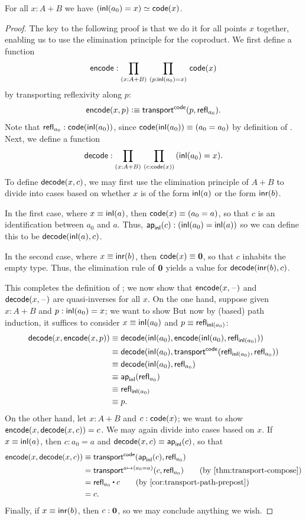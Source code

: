 \begin{thm}\label{thm:path-coprod}
  For all $x:A+B$ we have $({\mathsf{inl}}(a_0)=x) \simeq \mathsf{code}(x)$.
\end{thm}
\begin{proof}
  The key to the following proof is that we do it for all points $x$ together, enabling us to use the elimination principle for the coproduct.
  We first define a function
  \[ \encode : \prd{x:A+B}{p:\inl(a_0)=x} \code(x) \]
  by transporting reflexivity along $p$:
  \[ \mathsf{encode}(x,p) \vcentcolon\equiv \mathsf{transport}^{\mathsf{code}}(p,\mathsf{refl}_{a_0}). \]
  Note that $\mathsf{refl}_{a_0} : \mathsf{code}({\mathsf{inl}}(a_0))$, since $\mathsf{code}({\mathsf{inl}}(a_0))\equiv (a_0=a_0)$ by definition of \code.
  Next, we define a function
  \[ \decode : \prd{x:A+B}{c:\code(x)} (\inl(a_0)=x). \]
  To define $\mathsf{decode}(x,c)$, we may first use the elimination principle of $A+B$ to divide into cases based on whether $x$ is of the form ${\mathsf{inl}}(a)$ or the form ${\mathsf{inr}}(b)$.

  In the first case, where $x\equiv {\mathsf{inl}}(a)$, then $\mathsf{code}(x)\equiv (a_0=a)$, so that $c$ is an identification between $a_0$ and $a$.
  Thus, $\mathsf{ap}_{{\mathsf{inl}}}(c):({\mathsf{inl}}(a_0)={\mathsf{inl}}(a))$ so we can define this to be $\mathsf{decode}({\mathsf{inl}}(a),c)$.

  In the second case, where $x\equiv {\mathsf{inr}}(b)$, then $\mathsf{code}(x)\equiv \mathbf{0}$, so that $c$ inhabits the empty type.
  Thus, the elimination rule of $\mathbf{0}$ yields a value for $\mathsf{decode}({\mathsf{inr}}(b),c)$.

  This completes the definition of \decode; we now show that $\mathsf{encode}(x,{\mathord{\hspace{1pt}\text{--}\hspace{1pt}}})$ and $\mathsf{decode}(x,{\mathord{\hspace{1pt}\text{--}\hspace{1pt}}})$ are quasi-inverses for all $x$.
  On the one hand, suppose given $x:A+B$ and $p:{\mathsf{inl}}(a_0)=x$; we want to show
  But now by (based) path induction, it suffices to consider $x\equiv{\mathsf{inl}}(a_0)$ and $p\equiv \mathsf{refl}_{{\mathsf{inl}}(a_0)}$:
  \begin{align*}
    \mathsf{decode}(x,\mathsf{encode}(x,p))
    &\equiv \mathsf{decode}({\mathsf{inl}}(a_0),\mathsf{encode}({\mathsf{inl}}(a_0),\mathsf{refl}_{{\mathsf{inl}}(a_0)}))\\
    &\equiv \mathsf{decode}({\mathsf{inl}}(a_0),\mathsf{transport}^{\mathsf{code}}(\mathsf{refl}_{{\mathsf{inl}}(a_0)},\mathsf{refl}_{a_0}))\\
    &\equiv \mathsf{decode}({\mathsf{inl}}(a_0),\mathsf{refl}_{a_0})\\
    &\equiv \mathsf{ap}_{{\mathsf{inl}}}(\mathsf{refl}_{a_0})\\
    &\equiv \mathsf{refl}_{{\mathsf{inl}}(a_0)}\\
    &\equiv p.
  \end{align*}
  On the other hand, let $x:A+B$ and $c:\mathsf{code}(x)$; we want to show $\mathsf{encode}(x,\mathsf{decode}(x,c))=c$.
  We may again divide into cases based on $x$.
  If $x\equiv{\mathsf{inl}}(a)$, then $c:a_0=a$ and $\mathsf{decode}(x,c)\equiv \mathsf{ap}_{{\mathsf{inl}}}(c)$, so that
  \begin{align}
    \encode(x,\decode(x,c))
    &\jdeq \transfib{\code}{\apfunc{\inl}(c)}{\refl{a_0}}
    \notag\\
    &= \transfib{a\mapsto (a_0=a)}{c}{\refl{a_0}}
    \tag{by \cref{thm:transport-compose}}\\
    &= \refl{a_0} \ct c
    \tag{by \cref{cor:transport-path-prepost}}\\
    &= c. \notag
  \end{align}
  Finally, if $x\equiv {\mathsf{inr}}(b)$, then $c:\mathbf{0}$, so we may conclude anything we wish.
\end{proof}

